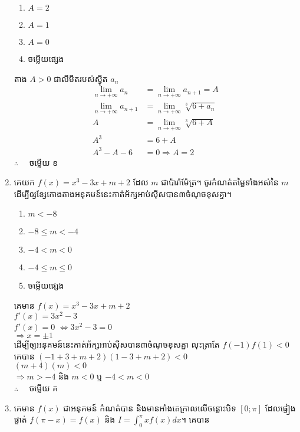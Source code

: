 \documentclass[12pt, a4paper]{article}
\begin{document}
\begin{enumerate}[m]
\begin{enumerate}[k,5]
		\item $A=2$
		\item $A=1$
		\item $A=0$
		\item ចម្លើយផ្សេង
	\end{enumerate}
	\answer
	\begin{center}
		តាង $A>0$ ជាលីមីតរបស់ស៊្វីត $a_n$\\
		\begin{align*}
		\lim\limits_{n\to +\infty}a_n&=\lim\limits_{n\to +\infty}a_{n+1}=A\\
		\lim\limits_{n\to +\infty}a_{n+1}&=\lim\limits_{n\to +\infty}\sqrt[3]{6+a_n}\\
		A&=\lim\limits_{n\to +\infty}\sqrt[3]{6+A}\\
		A^3&=6+A\\
		A^3-A-6&=0 \Rightarrow A=2
		\end{align*}
		$\therefore \quad$ \kml ចម្លើយ \kbk ខ
	\end{center}
	{\color{blue}\hrulefill}
	\item គេយក $f(x)=x^3-3x+m+2$ ដែល $m$ ជាប៉ារ៉ាម៉ែត្រ។ ចូរកំណត់តម្លៃទាំងអស់នៃ $m$ ដើម្បីឲ្សខ្សែកោងតាងអនុគមន៍នេះកាត់អ័ក្សអាប់ស៊ីសបាន៣ចំណុចខុសគ្នា។
	\begin{enumerate}[k,5]
		\item $m<-8$
		\item $-8\le m<-4$
		\item $-4<m<0$
		\item $-4\le m \le0$
		\item ចម្លើយផ្សេង
	\end{enumerate}
	\answer
	\begin{center}
		គេមាន $f(x)=x^3-3x+m+2$\\
		$f'(x)=3x^2-3$\\
		$f'(x)=0$
		$\Leftrightarrow 3x^2-3=0$\\
		$\Rightarrow x=\pm 1$\\
		ដើម្បីឲ្យអនុគមន៍នេះកាត់អ័ក្សអាប់ស៊ីសបាន៣ចំណុចខុសគ្នា លុះត្រាតែ $f(-1)f(1)<0$\\
		គេបាន $\left(-1+3+m+2\right)\left(1-3+m+2\right)<0$\\
		$\left(m+4\right)\left(m\right)<0$\\
		$\Rightarrow m>-4$ និង $m<0$ ឬ $-4<m<0$\\
		$\therefore \quad$ \kml ចម្លើយ \kbk គ
	\end{center}
	{\color{blue}\hrulefill}
	\item គេមាន $f(x)$ ជាអនុគមន៍	កំណត់បាន និងមានអាំងតេក្រាលលើចន្លោះបិទ $\left[0;\pi\right]$ ដែលផ្ទៀងផ្ទាត់ $f\left(\pi-x\right)=f(x)$ និង $I=\int_{0}^{\pi}xf(x)dx$។ គេបាន

\end{enumerate}
\end{document}
